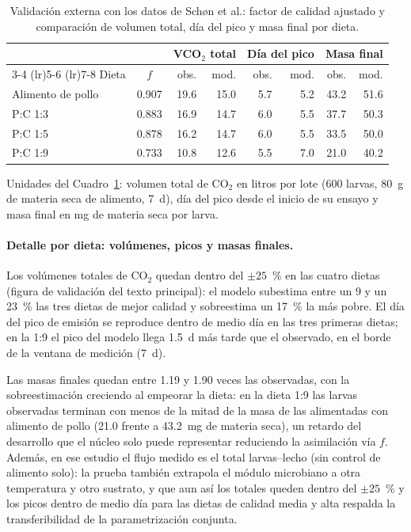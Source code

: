 \documentclass[11pt,a4paper]{article}
\begin{document}
\begin{table}[htbp]
\centering
\small
\caption{Validación externa con los datos de Schøn et al.: factor de calidad ajustado y comparación de volumen total, día del pico y masa final por dieta.}
\label{cua:schn}
\begin{tabular}{l c rr rr rr}
\toprule
& & \multicolumn{2}{c}{VCO$_2$ total} & \multicolumn{2}{c}{Día del pico} & \multicolumn{2}{c}{Masa final} \\
\cmidrule(lr){3-4} \cmidrule(lr){5-6} \cmidrule(lr){7-8}
Dieta & $f$ & obs. & mod. & obs. & mod. & obs. & mod. \\
\midrule
Alimento de pollo & 0.907 & 19.6 & 15.0 & 5.7 & 5.2 & 43.2 & 51.6 \\
P:C 1:3           & 0.883 & 16.9 & 14.7 & 6.0 & 5.5 & 37.7 & 50.3 \\
P:C 1:5           & 0.878 & 16.2 & 14.7 & 6.0 & 5.5 & 33.5 & 50.0 \\
P:C 1:9           & 0.733 & 10.8 & 12.6 & 5.5 & 7.0 & 21.0 & 40.2 \\
\bottomrule
\end{tabular}
\end{table}

\noindent Unidades del Cuadro~\ref{cua:schn}: volumen total de CO$_2$ en litros por lote (600 larvas, 80~g de materia seca de alimento, 7~d), día del pico desde el inicio de su ensayo y masa final en mg de materia seca por larva.

\paragraph{Detalle por dieta: volúmenes, picos y masas finales.}
Los volúmenes totales de CO$_2$ quedan dentro del $\pm 25$~\% en las cuatro dietas (figura de validación del texto principal): el modelo subestima entre un 9 y un 23~\% las tres dietas de mejor calidad y sobreestima un 17~\% la más pobre. El día del pico de emisión se reproduce dentro de medio día en las tres primeras dietas; en la 1:9 el pico del modelo llega 1.5~d más tarde que el observado, en el borde de la ventana de medición (7~d).

Las masas finales quedan entre 1.19 y 1.90 veces las observadas, con la sobreestimación creciendo al empeorar la dieta: en la dieta 1:9 las larvas observadas terminan con menos de la mitad de la masa de las alimentadas con alimento de pollo (21.0 frente a 43.2~mg de materia seca), un retardo del desarrollo que el núcleo solo puede representar reduciendo la asimilación vía $f$. Además, en ese estudio el flujo medido es el total larvas--lecho (sin control de alimento solo): la prueba también extrapola el módulo microbiano a otra temperatura y otro sustrato, y que aun así los totales queden dentro del $\pm 25$~\% y los picos dentro de medio día para las dietas de calidad media y alta respalda la transferibilidad de la parametrización conjunta.
\end{document}

